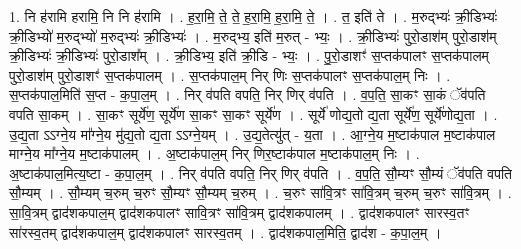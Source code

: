 \documentclass[17pt]{extarticle}
\begin{document}
1. नि ह॑रामि हरामि॒ नि नि ह॑रामि । . ह॒रा॒मि॒ ते॒ ते॒ ह॒रा॒मि॒ ह॒रा॒मि॒ ते॒ । . त॒ इति॑ ते । . म॒रुद्भ्यः॑ क्री॒डिभ्यः॑ क्री॒डिभ्यो॑ म॒रुद्भ्यो॑ म॒रुद्भ्यः॑ क्री॒डिभ्यः॑ । . म॒रुद्भ्य॒ इति॑ म॒रुत् - भ्यः॒ । . क्री॒डिभ्यः॑ पुरो॒डाश॑म् पुरो॒डाश॑म् क्री॒डिभ्यः॑ क्री॒डिभ्यः॑ पुरो॒डाश᳚म् । . क्री॒डिभ्य॒ इति॑ क्री॒डि - भ्यः॒ । . पु॒रो॒डाशꣳ॑ स॒प्तक॑पालꣳ स॒प्तक॑पालम् पुरो॒डाश॑म् पुरो॒डाशꣳ॑ स॒प्तक॑पालम् । . स॒प्तक॑पाल॒म् निर् णिः स॒प्तक॑पालꣳ स॒प्तक॑पाल॒म् निः । . स॒प्तक॑पाल॒मिति॑ स॒प्त - क॒पा॒ल॒म् । . निर् व॑पति वपति॒ निर् णिर् व॑पति । . व॒प॒ति॒ सा॒कꣳ सा॒कं ॅव॑पति वपति सा॒कम् । . सा॒कꣳ सूर्ये॑ण॒ सूर्ये॑ण सा॒कꣳ सा॒कꣳ सूर्ये॑ण । . सूर्ये॑ णोद्य॒तो द्य॒ता सूर्ये॑ण॒ सूर्ये॑णोद्य॒ता । . उ॒द्य॒ता ऽऽग्ने॒य मा᳚ग्ने॒य मु॑द्य॒तो द्य॒ता ऽऽग्ने॒यम् । . उ॒द्य॒तेत्यु॑त् - य॒ता । . आ॒ग्ने॒य म॒ष्टाक॑पाल म॒ष्टाक॑पाल माग्ने॒य मा᳚ग्ने॒य म॒ष्टाक॑पालम् । . अ॒ष्टाक॑पाल॒म् निर् णिर॒ष्टाक॑पाल म॒ष्टाक॑पाल॒म् निः । . अ॒ष्टाक॑पाल॒मित्य॒ष्टा - क॒पा॒ल॒म् । . निर् व॑पति वपति॒ निर् णिर् व॑पति । . व॒प॒ति॒ सौ॒म्यꣳ सौ॒म्यं ॅव॑पति वपति सौ॒म्यम् । . सौ॒म्यम् च॒रुम् च॒रुꣳ सौ॒म्यꣳ सौ॒म्यम् च॒रुम् । . च॒रुꣳ सा॑वि॒त्रꣳ सा॑वि॒त्रम् च॒रुम् च॒रुꣳ सा॑वि॒त्रम् । . सा॒वि॒त्रम् द्वाद॑शकपाल॒म् द्वाद॑शकपालꣳ सावि॒त्रꣳ सा॑वि॒त्रम् द्वाद॑शकपालम् । . द्वाद॑शकपालꣳ सारस्व॒तꣳ सा॑रस्व॒तम् द्वाद॑शकपाल॒म् द्वाद॑शकपालꣳ सारस्व॒तम् । . द्वाद॑शकपाल॒मिति॒ द्वाद॑श - क॒पा॒ल॒म् । \newline
\end{document}
